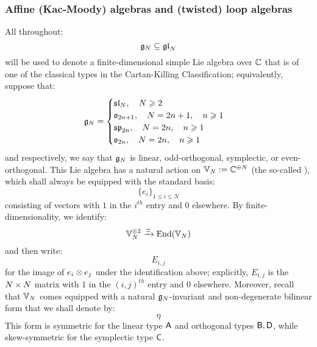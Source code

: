         \subsubsection{Affine (Kac-Moody) algebras and (twisted) loop algebras} 
            All throughout:
                $$\mathfrak{g}_N \subseteq \mathfrak{gl}_N$$
            will be used to denote a finite-dimensional simple Lie algebra over $\mathbb{C}$ that is of one of the classical types in the Cartan-Killing Classification; equivalently, suppose that:
                $$
                    \mathfrak{g}_N =
                    \begin{cases}
                        \mathfrak{sl}_N, \quad N \geqslant 2
                        \\
                        \mathfrak{o}_{2n + 1}, \quad N = 2n + 1, \quad n \geqslant 1
                        \\
                        \mathfrak{sp}_{2n}, \quad N = 2n, \quad n \geqslant 1
                        \\
                        \mathfrak{o}_{2n}, \quad N = 2n, \quad n \geqslant 1
                    \end{cases}
                $$
            and respectively, we say that $\mathfrak{g}_N$ is linear, odd-orthogonal, symplectic, or even-orthogonal. This Lie algebra has a natural action on $\mathbb{V}_N := \mathbb{C}^{\oplus N}$ (the so-called ), which shall always be equipped with the standard basis:
                $$\{e_i\}_{1 \leq i \leq N}$$
            consisting of vectors with $1$ in the $i^{th}$ entry and $0$ elsewhere. By finite-dimensionality, we identify:
                $$\bbV_N^{\tensor 2} \xrightarrow[]{\cong} \End(\bbV_N)$$
            and then write:
                $$E_{i, j}$$
            for the image of $e_i \tensor e_j$ under the identification above; explicitly, $E_{i, j}$ is the $N \x N$ matrix with $1$ in the $(i, j)^{th}$ entry and $0$ elsewhere. Moreover, recall that $\mathbb{V}_N$ comes equipped with a natural $\mathfrak{g}_N$-invariant and non-degenerate bilinear form that we shall denote by:
                $$\eta$$
            This form is symmetric for the linear type $\mathsf{A}$ and orthogonal types $\mathsf{B}, \mathsf{D}$, while skew-symmetric for the symplectic type $\mathsf{C}$.
        
